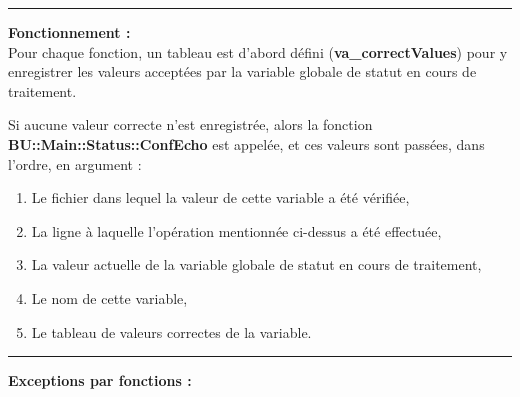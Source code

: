 \documentclass[a4paper,10pt]{article}
\begin{document}

\par\noindent\rule{\textwidth}{0.4pt}

\begin{justify}
    \textbf{Fonctionnement :}\\[1\baselineskip]
    Pour chaque fonction, un tableau est d'abord défini (\textbf{\color{orange}va\_correctValues}) pour y enregistrer les valeurs acceptées par la variable globale de statut en cours de traitement.
\end{justify}

\begin{justify}
    Si aucune valeur correcte n'est enregistrée, alors la fonction \textbf{\color{mauve}BU::Main::Status::ConfEcho} est appelée, et ces valeurs sont passées, dans l'ordre, en argument :
    
    \begin{enumerate}
        \item Le fichier dans lequel la valeur de cette variable a été vérifiée,
        \item La ligne à laquelle l'opération mentionnée ci-dessus a été effectuée,
        \item La valeur actuelle de la variable globale de statut en cours de traitement,
        \item Le nom de cette variable,
        \item Le tableau de valeurs correctes de la variable.
    \end{enumerate}
\end{justify}


\par\noindent\rule{\textwidth}{0.4pt}

\begin{justify}
    \textbf{Exceptions par fonctions :}
\end{justify}
\end{document}
